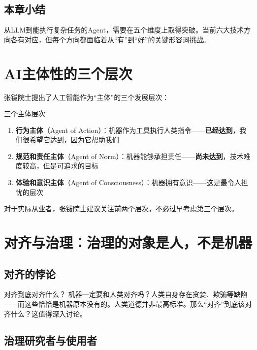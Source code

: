 \documentclass[a4paper]{article}
\begin{document}
\subsection{本章小结}

从LLM到能执行复杂任务的Agent，需要在五个维度上取得突破。当前六大技术方向各有对应，但每个方向都面临着从``有''到``好''的关键形容词挑战。


\section{AI主体性的三个层次}

张钹院士提出了人工智能作为``主体''的三个发展层次：

\begin{importantbox}{三个主体层次}
\begin{enumerate}
\item \textbf{行为主体}（Agent of Action）：机器作为工具执行人类指令——\textbf{已经达到}，我们很希望它达到，因为它帮助我们
\item \textbf{规范和责任主体}（Agent of Norm）：机器能够承担责任——\textbf{尚未达到}，技术难度较高，但是可追求的目标
\item \textbf{体验和意识主体}（Agent of Consciousness）：机器拥有意识——这是最令人担忧的层次
\end{enumerate}
\end{importantbox}

对于实际从业者，张钹院士建议关注前两个层次，不必过早考虑第三个层次。


\section{对齐与治理：治理的对象是人，不是机器}

\subsection{对齐的悖论}

\begin{warningbox}{对齐到底对齐什么？}
机器一定要和人类对齐吗？人类自身存在贪婪、欺骗等缺陷——而这些恰恰是机器原本没有的。人类道德并非最高标准。那么``对齐''到底该对齐什么？这值得深入讨论。
\end{warningbox}

\subsection{治理研究者与使用者}
\end{document}
